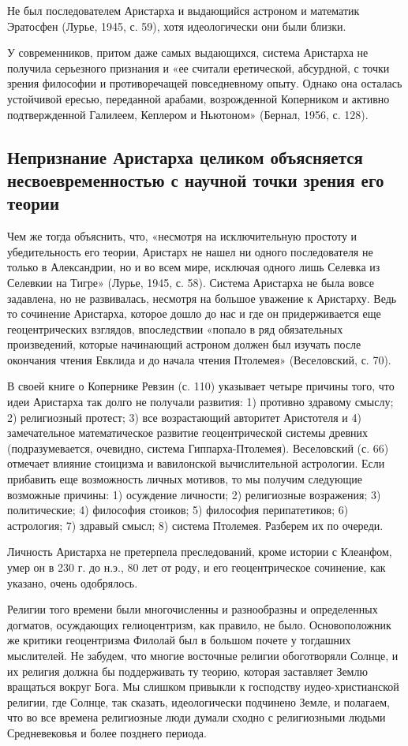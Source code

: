 Не был последователем Аристарха и выдающийся астроном и математик
Эратосфен (Лурье, 1945, с. 59), хотя идеологически они были близки.

У современников, притом даже самых выдающихся, система Аристарха не
получила серьезного признания и «ее считали еретической, абсурдной, с
точки зрения философии и противоречащей повседневному опыту. Однако
она осталась устойчивой ересью, переданной арабами, возрожденной
Коперником и активно подтвержденной Галилеем, Кеплером и Ньютоном»
(Бернал, 1956, с. 128).

\subsection{Непризнание Аристарха целиком объясняется
несвоевременностью с научной точки зрения его теории}

Чем же тогда объяснить, что, «несмотря на исключительную простоту
и убедительность его теории, Аристарх не нашел ни одного последователя
не только в Александрии, но и во всем мире, исключая одного лишь
Селевка из Селевкии на Тигре» (Лурье, 1945, с. 58). Система Аристарха
не была вовсе задавлена, но не развивалась, несмотря на большое
уважение к Аристарху. Ведь то сочинение Аристарха, которое дошло до
нас и где он придерживается еще геоцентрических взглядов, впоследствии
«попало в ряд обязательных произведений, которые начинающий астроном
должен был изучать после окончания чтения Евклида и до начала чтения
Птолемея» (Веселовский, с. 70).

В своей книге о Копернике Ревзин (с. 110) указывает четыре причины
того, что идеи Аристарха так долго не получали развития: 1) противно
здравому смыслу; 2) религиозный протест; 3) все возрастающий авторитет
Аристотеля и 4) замечательное математическое развитие геоцентрической
системы древних (подразумевается, очевидно, система
Гиппарха-Птолемея). Веселовский (с. 66) отмечает влияние стоицизма и
вавилонской вычислительной астрологии. Если прибавить еще возможность
личных мотивов, то мы получим следующие возможные причины: 1)
осуждение личности; 2) религиозные возражения; 3) политические; 4)
философия стоиков; 5) философия перипатетиков; 6) астрология; 7)
здравый смысл; 8) система Птолемея. Разберем их по очереди.

Личность Аристарха не претерпела преследований, кроме истории с
Клеанфом, умер он в 230 г. до н.э., 80 лет от роду, и его
геоцентрическое сочинение, как указано, очень одобрялось.

Религии того времени были многочисленны и разнообразны и определенных
догматов, осуждающих гелиоцентризм, как правило, не было.
Основоположник же критики геоцентризма Филолай был в большом почете у
тогдашних мыслителей. Не забудем, что многие восточные религии
обоготворяли Солнце, и их религия должна бы поддерживать ту теорию,
которая заставляет Землю вращаться вокруг Бога. Мы слишком привыкли к
господству иудео-христианской религии, где Солнце, так сказать,
идеологически подчинено Земле, и полагаем, что во все времена
религиозные люди думали сходно с религиозными людьми Средневековья и
более позднего периода.

